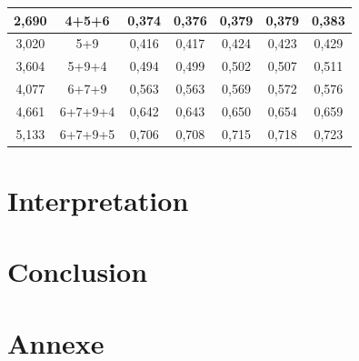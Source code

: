 \documentclass[11pt,a4paper]{report}
\begin{document}
\begin{center}
\begin{tabular}{|c|c|c|c|c|c|c|}
{\color[HTML]{963400} 2,690}                            & {\color[HTML]{963400} 4+5+6}                     & {\color[HTML]{00009B} 0,374}      & {\color[HTML]{00009B} 0,376}      & {\color[HTML]{00009B} 0,379}     & {\color[HTML]{00009B} 0,379}      & {\color[HTML]{00009B} 0,383}      \\ \hline
{\color[HTML]{963400} 3,020}                            & {\color[HTML]{963400} 5+9}                       & {\color[HTML]{00009B} 0,416}      & {\color[HTML]{00009B} 0,417}      & {\color[HTML]{00009B} 0,424}     & {\color[HTML]{00009B} 0,423}      & {\color[HTML]{00009B} 0,429}      \\ \hline
{\color[HTML]{963400} 3,604}                            & {\color[HTML]{963400} 5+9+4}                     & {\color[HTML]{00009B} 0,494}      & {\color[HTML]{00009B} 0,499}      & {\color[HTML]{00009B} 0,502}     & {\color[HTML]{00009B} 0,507}      & {\color[HTML]{00009B} 0,511}      \\ \hline
{\color[HTML]{963400} 4,077}                            & {\color[HTML]{963400} 6+7+9}                     & {\color[HTML]{00009B} 0,563}      & {\color[HTML]{00009B} 0,563}      & {\color[HTML]{00009B} 0,569}     & {\color[HTML]{00009B} 0,572}      & {\color[HTML]{00009B} 0,576}      \\ \hline
{\color[HTML]{963400} 4,661}                            & {\color[HTML]{963400} 6+7+9+4}                   & {\color[HTML]{00009B} 0,642}      & {\color[HTML]{00009B} 0,643}      & {\color[HTML]{00009B} 0,650}     & {\color[HTML]{00009B} 0,654}      & {\color[HTML]{00009B} 0,659}      \\ \hline
{\color[HTML]{963400} 5,133}                            & {\color[HTML]{963400} 6+7+9+5}                   & {\color[HTML]{00009B} 0,706}      & {\color[HTML]{00009B} 0,708}      & {\color[HTML]{00009B} 0,715}     & {\color[HTML]{00009B} 0,718}      & {\color[HTML]{00009B} 0,723}      \\ \hline

\end{tabular}
\end{center}
\section*{Interpretation}	
\section*{Conclusion}	
\section*{Annexe}	
\end{document}
